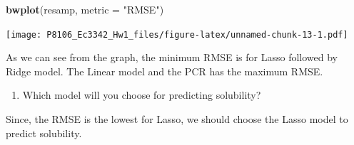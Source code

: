\documentclass[]{article}
\newenvironment{Shaded}{\begin{snugshade}}{\end{snugshade}}
\newcommand{\DataTypeTok}[1]{\textcolor[rgb]{0.13,0.29,0.53}{#1}}
\newcommand{\KeywordTok}[1]{\textcolor[rgb]{0.13,0.29,0.53}{\textbf{#1}}}
\newcommand{\NormalTok}[1]{#1}
\newcommand{\StringTok}[1]{\textcolor[rgb]{0.31,0.60,0.02}{#1}}
\providecommand{\tightlist}{%
  \setlength{\itemsep}{0pt}\setlength{\parskip}{0pt}}
\begin{document}
\begin{Shaded}
\begin{Highlighting}[]
\KeywordTok{bwplot}\NormalTok{(resamp, }\DataTypeTok{metric =} \StringTok{"RMSE"}\NormalTok{)}
\end{Highlighting}
\end{Shaded}

\texttt{[image: P8106\_Ec3342\_Hw1\_files/figure-latex/unnamed-chunk-13-1.pdf]}

As we can see from the graph, the minimum RMSE is for Lasso followed by
Ridge model. The Linear model and the PCR has the maximum RMSE.

\begin{enumerate}
\def\labelenumi{\alph{enumi})}
\setcounter{enumi}{5}
\tightlist
\item
  Which model will you choose for predicting solubility?
\end{enumerate}

Since, the RMSE is the lowest for Lasso, we should choose the Lasso
model to predict solubility.
\end{document}
